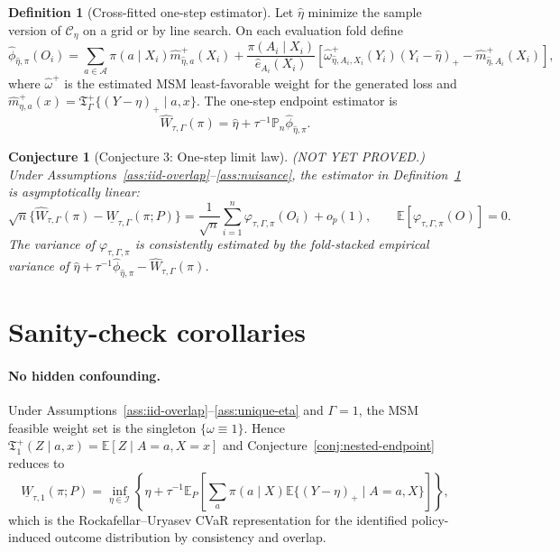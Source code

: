 \documentclass[11pt]{article}
\newcommand{\E}{\mathbb{E}}
\theoremstyle{definition}
\newtheorem{definition}{Definition}
\theoremstyle{plain}
\newtheorem{conjecture}{Conjecture}
\theoremstyle{remark}
\begin{document}
\begin{definition}[Cross-fitted one-step estimator]\label{def:onestep}
Let \(\hat\eta\) minimize the sample version of \(\mathcal C_\eta\) on a grid or by line search.  On each evaluation fold define
\[
\hat\phi_{\hat\eta,\pi}(O_i)
=
\sum_{a\in\mathcal A}\pi(a\mid X_i)\hat m_{\hat\eta,a}^{+}(X_i)
+
\frac{\pi(A_i\mid X_i)}{\hat e_{A_i}(X_i)}
\left[
\hat\omega_{\hat\eta,A_i,X_i}^{+}(Y_i)(Y_i-\hat\eta)_+
-\hat m_{\hat\eta,A_i}^{+}(X_i)
\right],
\]
where \(\hat\omega^+\) is the estimated MSM least-favorable weight for the generated loss and \(\hat m_{\eta,a}^{+}(x)=\mathfrak T_{\Gamma}^{+}\{(Y-\eta)_+\mid a,x\}\).  The one-step endpoint estimator is
\[
\hat W_{\tau,\Gamma}(\pi)
=
\hat\eta+\tau^{-1}\mathbb P_n\hat\phi_{\hat\eta,\pi}.
\]
\end{definition}

\begin{conjecture}[Conjecture 3: One-step limit law]\label{conj:onestep-limit}
(NOT YET PROVED.)  Under Assumptions~\ref{ass:iid-overlap}--\ref{ass:nuisance}, the estimator in Definition~\ref{def:onestep} is asymptotically linear:
\[
\sqrt n\{\hat W_{\tau,\Gamma}(\pi)-\underline W_{\tau,\Gamma}(\pi;P)\}
=
\frac{1}{\sqrt n}\sum_{i=1}^n
\varphi_{\tau,\Gamma,\pi}(O_i)+o_p(1),
\qquad
\E[\varphi_{\tau,\Gamma,\pi}(O)]=0.
\]
The variance of \(\varphi_{\tau,\Gamma,\pi}\) is consistently estimated by the fold-stacked empirical variance of \(\hat\eta+\tau^{-1}\hat\phi_{\hat\eta,\pi}-\hat W_{\tau,\Gamma}(\pi)\).
\end{conjecture}

\section{Sanity-check corollaries}
\paragraph{No hidden confounding.}
Under Assumptions~\ref{ass:iid-overlap}--\ref{ass:unique-eta} and \(\Gamma=1\), the MSM feasible weight set is the singleton \(\{\omega\equiv1\}\).  Hence \(\mathfrak T_1^+(Z\mid a,x)=\E[Z\mid A=a,X=x]\) and Conjecture~\ref{conj:nested-endpoint} reduces to
\[
\underline W_{\tau,1}(\pi;P)
=
\inf_{\eta\in\mathcal I}
\left\{\eta+\tau^{-1}\E_P\left[
\sum_a\pi(a\mid X)\E\{(Y-\eta)_+\mid A=a,X\}
\right]\right\},
\]
which is the Rockafellar--Uryasev CVaR representation for the identified policy-induced outcome distribution by consistency and overlap.
\end{document}
